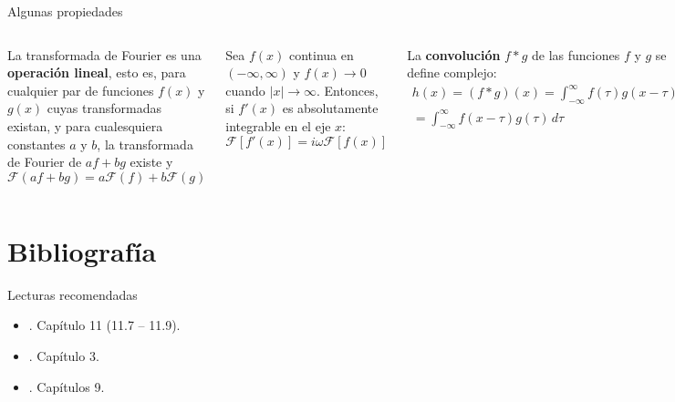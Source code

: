 \documentclass[9pt, aspectratio=169]{beamer}
\begin{document}
\begin{frame}{Algunas propiedades}
\begin{columns}[c]
\cx
\begin{theorem}
    La transformada de Fourier es una \textbf{operación lineal}, esto es, para cualquier par de funciones $f(x)$ y $g(x)$ cuyas transformadas existan, y para cualesquiera constantes $a$ y $b$, la transformada de Fourier de $af + bg$ existe y
\begin{equation*}
    \mathscr{F}(a f + b g) = a \mathscr{F}(f) +  b \mathscr{F}(g)
\end{equation*}
\end{theorem} \pause

\begin{theorem}
Sea $f(x)$ continua en $(-\infty, \infty)$ y $f(x) \rightarrow 0$ cuando $|x| \rightarrow \infty$. Entonces, si $f'(x)$ es absolutamente integrable en el eje $x$:
\[ \mathscr{F}[ f'(x)] = i \omega \mathscr{F}[f(x)]  \]
\end{theorem}
\pause 

\cx
La \textbf{convolución} $f * g$ de las funciones $f$ y $g$ se define complejo:
\begin{multline*}
    h(x) = (f * g)(x) = \int_{-\infty}^{\infty} f(\tau) g(x - \tau) \, d\tau \\
= \int_{-\infty}^{\infty} f(x - \tau) g(\tau) \, d\tau 
\end{multline*}
\pause 

\begin{theorem}[Convolución]
Sean $f(x)$ y $g(x)$ funciones acotadas, continuas por tramos, y absolutamente integrables en $(-\infty, \infty)$, entonces
\[ \mathscr{F}(f * g) = \sqrt{2 \pi} \mathscr{F}(f) \mathscr{F}(g) \]
\end{theorem}

\end{columns}
\end{frame}


\section*{Bibliografía}
\begin{frame}{Lecturas recomendadas}
\begin{itemize}
 \item {}. Capítulo 11 (11.7 -- 11.9).
 \item {}. Capítulo 3.
 \item {}. Capítulos 9.
\end{itemize}
\end{frame}
\end{document}

